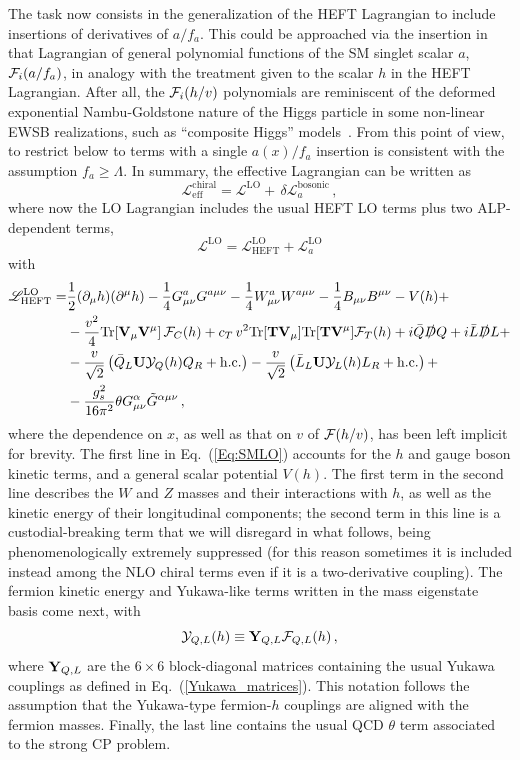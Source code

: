 \documentclass[11pt]{article}
\newcommand{\F}{\mathcal{F}}
\newcommand{\T}{\mathbf{T}}
\newcommand{\U}{\mathbf{U}}
\newcommand{\V}{\mathbf{V}}
\newcommand{\BBu}{B^{\mu\nu}}
\newcommand{\BBd}{B_{\mu\nu}}
\newcommand{\WWd}{W_{\mu\nu}}
\newcommand{\tr}{{\rm Tr}}
\newcommand{\derp}{\partial}
\newcommand{\hc}{\mathrm{h.c.}}
\newcommand{\beq}{\begin{equation}}
\newcommand{\eeq}{\end{equation}}
\renewcommand{\[}{\begin{equation}}
\renewcommand{\]}{\end{equation}}
\newcommand{\LL}{\mathscr{L}}
\newcommand{\VL}{\mathbf{V}}
\def\cY{{\bf Y}}
\def\cF{{\cal F}}
\def\cY{{\bf Y}}
\begin{document}
The task now consists in the generalization of the HEFT Lagrangian  to include  insertions of derivatives of $a/f_a$. This could be approached via the  insertion in that  Lagrangian of  general polynomial functions  of the SM singlet  scalar $a$, $\cF_i(a/f_a)$, in analogy with the treatment given to the scalar $h$ in the HEFT Lagrangian. After all, the $\cF_i(h/v)$ polynomials  are reminiscent of the deformed exponential Nambu-Goldstone nature  of the Higgs particle in some non-linear EWSB realizations, such as ``composite Higgs'' models~\cite{Kaplan:1983fs,Kaplan:1983sm,Banks:1984gj}.  From this point of view, to restrict below to terms with a single $a(x)/f_a$ insertion is consistent with the assumption $f_a\ge \Lambda$. In summary, the effective Lagrangian can be written as
\beq
\LL_\text{eff}^\text{chiral}=\LL^{\text{LO}}+\, \delta\LL_a^\text{bosonic}\,,
\label{Lchiral}
\eeq
where now the LO Lagrangian includes the usual HEFT LO terms plus two ALP-dependent terms,
\beq
\LL^{\text{LO}}= \LL^{\text{LO}}_{\text{HEFT}} + \LL^{\text{LO}}_a
\label{Lchiral-LO}
\eeq
with
\beq
\begin{split}
\LL^{\text{LO}}_{\text{HEFT}}=& \frac{1}{2} (\derp_\mu h)(\derp^\mu h) -\dfrac{1}{4} G^a_{\mu\nu}G^{a\mu\nu}-\dfrac{1}{4}\WWd^a W^{a\mu\nu}-\dfrac{1}{4}\BBd\BBu- V (h)+\\
&-\dfrac{v^2}{4}\tr[\VL_\mu\VL^\mu]\,\F_C (h)+c_T\,v^2\tr[\T\V_\mu]\tr[\T\V^\mu]\cF_T(h)+ i\bar{Q}\slashed{D}Q+i\bar{L}\slashed{D}L+\\
&-\dfrac{v}{\sqrt2}\left(\bar{Q}_L\U \mathcal{Y}_Q(h) Q_R+\hc\right)-\dfrac{v}{\sqrt2}\left(\bar{L}_L\U \mathcal{Y}_L(h) L_R+\hc\right)+\\
&-\dfrac{g_s^2}{16\pi^2}\theta G^\alpha_{\mu\nu}\tilde{G}^{\alpha\mu\nu}\,,
\end{split}
\label{Eq:SMLO}
\eeq
where the dependence on $x$,   
as well as that on $v$ of $\cF(h/v)$, has been left implicit for  brevity.  The first line in Eq.~(\ref{Eq:SMLO}) accounts for the $h$ and gauge boson kinetic terms,  and a general scalar potential $V(h)$. The  first term in the second line describes the $W$ and $Z$ 
masses and their interactions with $h$, as well as the kinetic energy of their longitudinal components;  the second term in this line is a custodial-breaking term that we will disregard in what follows, being phenomenologically extremely suppressed (for this reason sometimes it is included instead among the NLO chiral terms even if it is a two-derivative coupling). The fermion kinetic energy and Yukawa-like terms written in the mass eigenstate basis come next, with 
\beq
\mathcal{Y}_{Q,L}(h)\equiv\cY_{Q,L}\cF_{Q,L}(h)\,,
\label{curly_Y}
\eeq
 where $\cY_{Q,L}$ are the $6\times6$ block-diagonal matrices containing the usual 
Yukawa couplings as defined in Eq.~(\ref{Yukawa_matrices}).
 This notation follows the assumption that the  Yukawa-type fermion-$h$ couplings are aligned with the fermion masses.
Finally, the last line contains the usual QCD $\theta$ term associated to the strong CP problem. 
\end{document}
